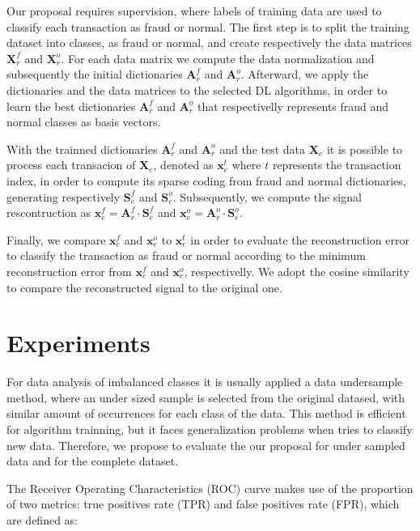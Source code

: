Our proposal requires supervision, where labels of training data are used to classify each transaction as fraud or normal. The first step is to split the training dataset into classes, as fraud or normal, and create respectively the data matrices $\boldsymbol{X}_r^f$ and $\boldsymbol{X}_r^o$. For each data matrix we compute the data normalization and subsequently the initial dictionaries $\boldsymbol{A}_r^f$ and $\boldsymbol{A}_r^o$. Afterward, we apply the dictionaries and the data matrices to the selected DL algorithms, in order to learn the best dictionaries $\boldsymbol{A}_r^f$ and $\boldsymbol{A}_r^o$ that respectivelly represents fraud and normal classes as basis vectors.

With the trainned dictionaries $\boldsymbol{A}_r^f$ and $\boldsymbol{A}_r^o$ and the test data $\boldsymbol{X}_e$ it is possible to process each transacion of $\boldsymbol{X}_e$, denoted as $\boldsymbol{x}_e^t$ where $t$ represents the transaction index, in order to compute its sparse coding from fraud and normal dictionaries, generating respectively $\boldsymbol{S}_e^f$ and $\boldsymbol{S}_e^o$. Subsequently, we compute the signal rescontruction as $\boldsymbol{x}_e^f = \boldsymbol{A}_r^f \cdot \boldsymbol{S}_e^f$ and $\boldsymbol{x}_e^o = \boldsymbol{A}_r^o \cdot \boldsymbol{S}_e^o$. 

Finally, we compare $\boldsymbol{x}_e^f$ and $\boldsymbol{x}_e^o$ to $\boldsymbol{x}_e^t$ in order to evaluate the reconstruction error to classify the transaction as fraud or normal according to the minimum reconstruction error from $\boldsymbol{x}_e^f$ and $\boldsymbol{x}_e^o$, respectivelly. We adopt the cosine similarity to compare the reconstructed signal to the original one. 


\section{Experiments}
\label{sec:4_experiments}

For data analysis of imbalanced classes it is usually applied a data undersample method, where an under sized sample is selected from the original datased, with similar amount of occurrences for each class of the data. This method is efficient for algorithm trainning, but it faces generalization problems when tries to classify new data. Therefore, we propose to evaluate the our proposal for under sampled data and for the complete dataset.

The Receiver Operating Characteristics (ROC) curve makes use of the proportion of two metrics: true positives rate (TPR) and false positives rate (FPR), which are defined as:

